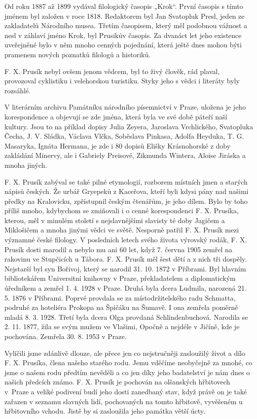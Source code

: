 \documentclass[../dejiny-rodu-prusiku.tex]{subfiles}
\begin{document}
Od roku 1887 až 1899 vydával filologický časopis „Krok“. První časopis s tímto jménem byl založen v roce 1818. Redaktorem byl Jan Svatopluk Presl, jeden ze zakladate­lů Národního musea. Třetím časopisem, který měl podob­nou vážnost a nesl v záhlaví jméno Krok, byl Prusikův časopis. Za dvanáct let jeho existence uveřejněné bylo v něm mnoho cenných pojednání, která ještě dnes mohou býti pramenem nových poznatků filologů a historiků.

F. X. Prusík nebyl ovšem jenom vědcem, byl to živý člověk, rád plaval, provozoval cyklistiku i velehorskou turistiku. Styky jeho s vědci i literáty byly rozsáhlé.

V literárním archivu Památníku národního písemnictví v Praze, uložena je jeho korespondence a objevují se zde  jména, která byla ve své době páteří naší kultury. Jsou to na příklad dopisy Julia Zeyera, Jaroslava Vrchlické­ho, Svatopluka Čecha, J. V. Sládka, Václava Vlčka, Soběsla­va Pinkasa, Adolfa Heyduka, T. G. Masaryka, Ignáta Hermana, je zde i 80 dopisů Elišky Krásnohorské z doby zakládání Minervy, ale i Gabriely Preisové, Zikmunda Wintera, Aloise Jiráska a mnoha jiných.

F. X. Prusík zabýval se také pilné etymologií, rozborem místních jmen a starých nápisů českých. Že urbář Gryepeků z Kaceřova, kteří byli kdysi pány nad našimi předky na Kralovicku, zpřístupnil českým čtenářům, je jeho
dílem. Bylo by toho příliš mnoho, kdybychom se zmiňovali i o cenné korespondenci F. X. Prusíka, kterou, měl v minulém století s nejslavnějšími slavisty té doby Jagičem a Miklošičem a mnoha jinými vědci ve světě. Nesporně patřil F. X. Prusík mezi významné české filology. V posledních letech svého života výrovský rodák, F. X. Prusík dosti marodil a nebylo mu ani 60 let, když 7. června 1905 zemřel na rakovinu ve Stupčicích u Tábora. F. X. Prusík měl šest dětí a z nich tři dospěly. Nejstarší byl syn Bořivoj, který se narodil 31. 10. 1872 v Příbrami. Byl hlavním bibliotekářem Universitní knihovny v Praze, překladatelem a diplomatickým úředníkem a zemřel 1. 4. 1928 v Praze. Druhá byla dcera Ludmila, na­rozená 21. 5. 1876 v Příbrami. Poprvé provdala se za místodržitelského radu Schmatta, podruhé za hoteliéra Pro­kopa na Špičáku na Šumavě. I ona zemřela poměrně mladá 8. 3. 1928. Třetí byla dcera Olga provdaná Schlindenbuchová. Narodila se 2. 11. 1877, žila se svým mužem ve Vlašimi, Opočně a nejdéle v Jičíně, kde je pochována. Zemřela 30. 8. 1953 v Praze.

Vylíčili jsme zdánlivě dlouze, ale přece jen co nejstručněji zasloužilý život a dílo F. X. Prusíka, člena  našeho starého rodu. Jemu vděčíme neobyčejně za mnohé, co jsme o našem rodu předtím nevěděli a co jen dí­ky jeho badatelství je nám dnes o našich předcích známo. F. X. Prusík je pochován na olšanských hřbitovech v Praze a veliké podivení budí jeho dosti zanedbaný stav, když právě on je také zařazen v seznamu slavných lidí, pochovaných na tomto hřbitově, vyvěšeném u hřbitovního vchodu. Jistě by si zasloužila jeho památka větší úcty.
\end{document}
